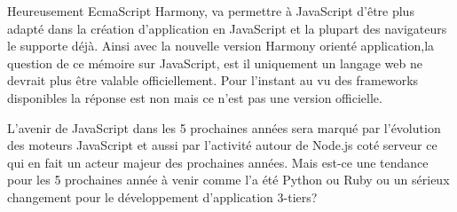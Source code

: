 Heureusement EcmaScript Harmony, va permettre à JavaScript d'être plus adapté dans la création d'application en JavaScript et la plupart des navigateurs le supporte déjà. Ainsi avec la nouvelle version Harmony orienté application,la question de ce mémoire sur JavaScript, est il uniquement un langage web ne devrait plus être valable officiellement. Pour l'instant au vu des frameworks disponibles la réponse est non mais ce n'est pas une version officielle.

L'avenir de JavaScript dans les 5 prochaines années sera marqué par l'évolution des moteurs JavaScript et aussi par l'activité autour de Node.js coté serveur ce qui en fait un acteur majeur des prochaines années. Mais est-ce une tendance pour les 5 prochaines année à venir comme l'a été Python ou Ruby ou un sérieux changement pour le développement d'application 3-tiers?